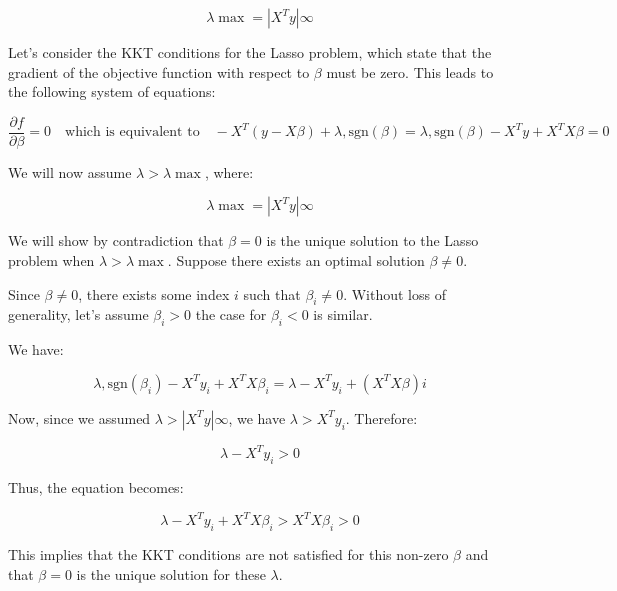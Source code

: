\documentclass[11pt]{article}
\begin{document}
\begin{solution}  %

    \begin{equation}
        \lambda{\max} = | X^T y |{\infty}
    \end{equation}
    
    Let’s consider the KKT conditions for the Lasso problem, which state that the gradient of the objective function with respect to $ \beta $ must be zero. This leads to the following system of equations:
    
    \[
    \frac{\partial f}{\partial \beta} = 0 \quad \text{which is equivalent to} \quad -X^T (y - X\beta) + \lambda , \text{sgn}(\beta) = \lambda , \text{sgn}(\beta) - X^T y + X^T X \beta = 0
    \]
    
    
    We will now assume $ \lambda > \lambda{\max} $, where:
    
    \[
    \lambda{\max} = | X^T y |{\infty}
    \]
    
    We will show by contradiction that $\beta = 0$ is the unique solution to the Lasso problem when $ \lambda > \lambda{\max} $. Suppose there exists an optimal solution $\beta \neq 0$.
    
    Since $\beta \neq 0$, there exists some index $i$ such that $ \beta_i \neq 0$. Without loss of generality, let’s assume $\beta_i > 0$ the case for $ \beta_i < 0$ is similar.
    
    We have:
    
    \[
    \lambda , \text{sgn}(\beta_i) - {X^T y}_i + {X^T X \beta}_i = \lambda - {X^T y}_i + (X^T X \beta)i
    \]
    
    Now, since we assumed $ \lambda > | X^T y |{\infty} $, we have $ \lambda > {X^T y}_i $. Therefore:
    
    \[
    \lambda - {X^T y}_i > 0
    \]
    
    Thus, the equation becomes:
    
    \[
    \lambda - {X^T y}_i + {X^T X \beta}_i > {X^T X \beta}_i > 0
    \]
    
    This implies that the KKT conditions are not satisfied for this non-zero \( \beta \) and that \( \beta = 0 \) is the unique solution for these \(\lambda\).
    
\end{solution}  %
\end{document}
